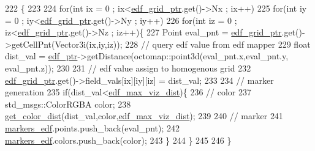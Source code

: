 \begin{DoxyCode}
222                                 \{
223 
224     \textcolor{keywordflow}{for}(\textcolor{keywordtype}{int} ix = 0 ; ix<\hyperlink{class_objects_handler_af2063609510d5ad8f136a275b0d127c1}{edf\_grid\_ptr}.get()->Nx ; ix++)
225         \textcolor{keywordflow}{for}(\textcolor{keywordtype}{int} iy = 0 ; iy<\hyperlink{class_objects_handler_af2063609510d5ad8f136a275b0d127c1}{edf\_grid\_ptr}.get()->Ny ; iy++)
226             \textcolor{keywordflow}{for}(\textcolor{keywordtype}{int} iz = 0 ; iz<\hyperlink{class_objects_handler_af2063609510d5ad8f136a275b0d127c1}{edf\_grid\_ptr}.get()->Nz ; iz++)\{
227                 Point eval\_pnt = \hyperlink{class_objects_handler_af2063609510d5ad8f136a275b0d127c1}{edf\_grid\_ptr}.get()->getCellPnt(Vector3i(ix,iy,iz));  
228                 \textcolor{comment}{// query edf value from edf mapper                       }
229                 \textcolor{keywordtype}{float} dist\_val = \hyperlink{class_objects_handler_aa96d8c71f5e8c6423c88d3302220d4cf}{edf\_ptr}->getDistance(octomap::point3d(eval\_pnt.x,eval\_pnt.y,
      eval\_pnt.z));
230 
231                 \textcolor{comment}{// edf value assign to homogenous grid  }
232                 \hyperlink{class_objects_handler_af2063609510d5ad8f136a275b0d127c1}{edf\_grid\_ptr}.get()->field\_vals[ix][iy][iz] = dist\_val;
233 
234                 \textcolor{comment}{// marker generation}
235                 \textcolor{keywordflow}{if}(dist\_val<\hyperlink{class_objects_handler_a577e8b62f1e55d36330048fb9fd3a432}{edf\_max\_viz\_dist})\{                
236                     \textcolor{comment}{// color }
237                     std\_msgs::ColorRGBA color;                    
238                     \hyperlink{_common_8h_a4b2e4b6698ff92678b23392dc111b36d}{get\_color\_dist}(dist\_val,color,\hyperlink{class_objects_handler_a577e8b62f1e55d36330048fb9fd3a432}{edf\_max\_viz\_dist});
239 
240                     \textcolor{comment}{// marker }
241                     \hyperlink{class_objects_handler_ad6904dcaaad790234569760df0fb0ac2}{markers\_edf}.points.push\_back(eval\_pnt);
242                     \hyperlink{class_objects_handler_ad6904dcaaad790234569760df0fb0ac2}{markers\_edf}.colors.push\_back(color);                    
243                 \}
244             \}    
245 
246 \}
\end{DoxyCode}
